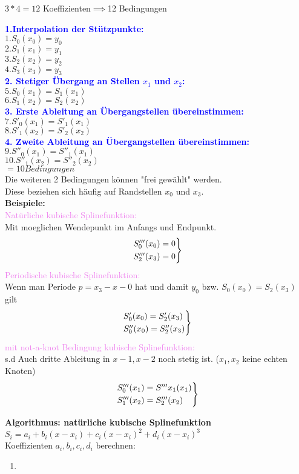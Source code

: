 \documentclass[../ZF_HM2.tex]{subfiles}
\begin{document}
$3*4 = 12$ Koeffizienten$\implies $12 Bedingungen

\textbf{\textcolor{blue}{1.Interpolation der Stützpunkte:}\\}
$1. S_0(x_0) = y_0$\\
$2. S_1(x_1) = y_1$\\
$3. S_2(x_2) = y_2$\\
$4. S_3(x_3) = y_3$\\

\textbf{\textcolor{blue}{2. Stetiger Übergang an Stellen $x_1$ und $x_2$:}\\}
$5. S_0(x_1) =S_1(x_1)$\\
$6. S_1(x_2) =S_2(x_2)$\\

\textbf{\textcolor{blue}{3. Erste Ableitung an Übergangstellen übereinstimmen:}\\}
$7. S'_0(x_1) =S'_1(x_1)$\\
$8. S'_1(x_2) =S'_2(x_2)$\\

\textbf{\textcolor{blue}{4. Zweite Ableitung an Übergangstellen übereinstimmen:}\\}
$9. S''_0(x_1) =S''_1(x_1)$\\
$10. S''_1(x_2) =S''_2(x_2)$\\

$= 10 Bedingungen$\\

Die weiteren 2 Bedingungen können "frei gewählt" werden.\\
Diese beziehen sich häufig auf Randstellen $x_0$ und $x_3$.\\
\textbf{Beispiele:\\}
\textcolor{violet}{Natürliche kubische Splinefunktion:}\\
Mit moeglichen Wendepunkt im Anfangs und Endpunkt.\\
\[
\begin{rcases*}
S'''_0(x_0) = 0\\
S'''_2(x_3) = 0\\
\end{rcases*} 
\]
\textcolor{violet}{Periodische kubische Splinefunktion:\\}
Wenn man Periode $p=x_3-x-0$ hat und damit $y_0$ bzw. $S_0(x_0) = S_2(x_3)$ gilt
\[
\begin{rcases*}
S'_0(x_0) = S'_2(x_3) \\
S''_0(x_0) = S''_2(x_3) \\
\end{rcases*} 
\]
\textcolor{violet}{mit not-a-knot Bedingung kubische Splinefunktion:\\}
s.d Auch dritte Ableitung in $x-1,x-2$ noch stetig ist. ($x_1,x_2$ keine echten Knoten)
\[
\begin{rcases*}
S'''_0(x_1) = S'''x_1(x_1) \\
S'''_1(x_2) = S'''_2(x_2) \\
\end{rcases*} 
\]


\begin{mdframed}
	\textbf{Algorithmus: natürliche kubische Splinefunktion\\}
	$S_i = a_i + b_i(x-x_i) + c_i(x-x_i)^{2} + d_i(x-x_i)^{3}$\\
Koeffizienten $a_i,b_i,c_i,d_i$ berechnen:
\begin{enumerate}
	\item 
\end{enumerate}
	
\end{mdframed}
\end{document}
